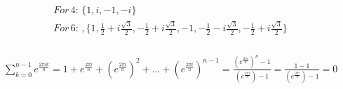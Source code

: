 \documentclass[11pt,a4paper]{scrartcl}
\begin{document}
\subsection{} %
\subsubsection{} %
\begin{align}
For \,4: \,\{1, i, -1, -i\}\\
For \,6: \, ,\{1, \frac{1}{2} + i\frac{\sqrt{3}}{2}, -\frac{1}{2} + i\frac{\sqrt{3}}{2}, -1, -\frac{1}{2} - i\frac{\sqrt{3}}{2}, -\frac{1}{2} + i\frac{\sqrt{3}}{2}\}
\end{align}

\subsubsection{} %
\begin{align}
\sum\limits_{k=0}^{n-1} e^{\frac{2 \pi ik}{n}} = 1 + e^{\frac{2 \pi i}{n}} + (e^{\frac{2 \pi i}{n}})^2 + ... +  (e^{\frac{2 \pi i}{n}})^{n - 1} = \frac{ (e^{\frac{2 \pi i}{n}})^n - 1}{ (e^{\frac{2 \pi i}{n}}) - 1} =  \frac{1 - 1}{ (e^{\frac{2 \pi i}{n}}) - 1} = 0
\end{align}
\end{document}
